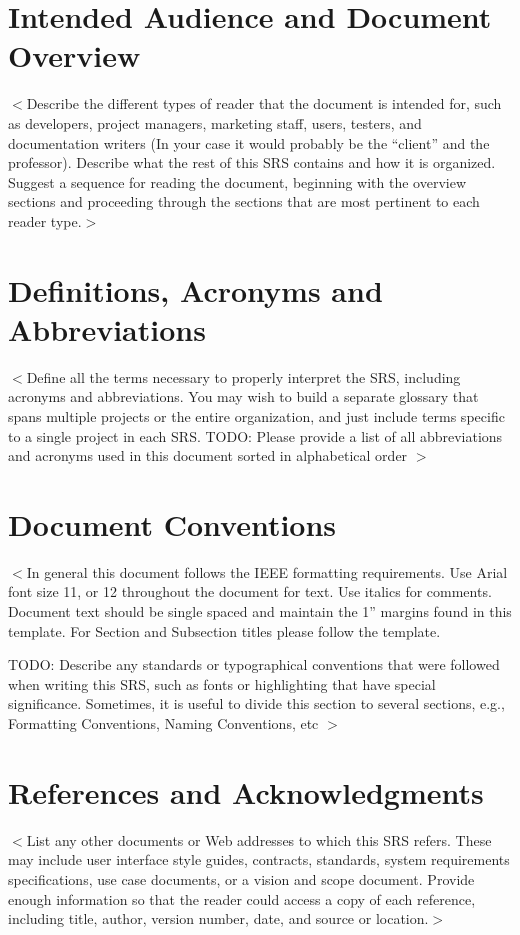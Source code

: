 \documentclass[a4paper, 11pt]{scrreprt}
\begin{document}
\section{Intended Audience and Document Overview}
$<$Describe the different types of reader that the document is intended for, such as developers, project managers, marketing staff, users, testers, and documentation writers (In your case it would probably be the “client” and the professor). Describe what the rest of this SRS contains and how it is organized. Suggest a sequence for reading the document, beginning with the overview sections and proceeding through the sections that are most pertinent to each reader type.$>$

\section{Definitions, Acronyms and Abbreviations}
$<$Define all the terms necessary to properly interpret the SRS, including acronyms and abbreviations. You may wish to build a separate glossary that spans multiple projects or the entire organization, and just include terms specific to a single project in each SRS.
TODO: Please provide a list of all abbreviations and acronyms used in this document sorted in alphabetical order
$>$

\section{Document Conventions}
$<$In general this document follows the IEEE formatting requirements. Use Arial font size 11, or 12 throughout the document for text. Use italics for comments. Document text should be single spaced and maintain the 1” margins found in this template. For Section and Subsection titles please follow the template. 

TODO: Describe any standards or typographical conventions that were followed when writing this SRS, such as fonts or highlighting that have special significance. Sometimes, it is useful to divide this section to several sections, e.g., Formatting Conventions, Naming Conventions, etc
$>$

\section{References and Acknowledgments}
$<$List any other documents or Web addresses to which this SRS refers. These may 
include user interface style guides, contracts, standards, system requirements 
specifications, use case documents, or a vision and scope document. Provide 
enough information so that the reader could access a copy of each reference, 
including title, author, version number, date, and source or location.$>$
\end{document}
